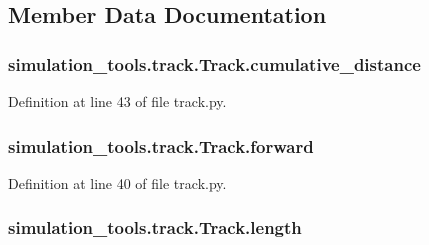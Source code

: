 \subsection{Member Data Documentation}
\subsubsection[{\texorpdfstring{cumulative\+\_\+distance}{cumulative_distance}}]{\setlength{\rightskip}{0pt plus 5cm}simulation\+\_\+tools.\+track.\+Track.\+cumulative\+\_\+distance}\hypertarget{classsimulation__tools_1_1track_1_1_track_a4513ffc3cdb1963bce98c678b093c40b}{}\label{classsimulation__tools_1_1track_1_1_track_a4513ffc3cdb1963bce98c678b093c40b}


Definition at line 43 of file track.\+py.

\subsubsection[{\texorpdfstring{forward}{forward}}]{\setlength{\rightskip}{0pt plus 5cm}simulation\+\_\+tools.\+track.\+Track.\+forward}\hypertarget{classsimulation__tools_1_1track_1_1_track_ae944fe956579cafe73bf09d3a7c072bc}{}\label{classsimulation__tools_1_1track_1_1_track_ae944fe956579cafe73bf09d3a7c072bc}


Definition at line 40 of file track.\+py.

\subsubsection[{\texorpdfstring{length}{length}}]{\setlength{\rightskip}{0pt plus 5cm}simulation\+\_\+tools.\+track.\+Track.\+length}\hypertarget{classsimulation__tools_1_1track_1_1_track_a24b60622edd3b0825f31fd6426d9380b}{}\label{classsimulation__tools_1_1track_1_1_track_a24b60622edd3b0825f31fd6426d9380b}


